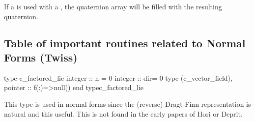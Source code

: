 \documentclass{hitec}     %
\begin{document}
{{{If a   is used with a , the quaternion array will be filled with the resulting quaternion.




\subsection{Table of  important routines related to Normal Forms (Twiss) }\label{s:improu}

\begin{code}
type c_factored_lie
integer :: n = 0
integer :: dir= 0
type (c_vector_field), pointer :: f(:)=>null()
end typec_factored_lie
\end{code}

This type is used in normal forms since the (reverse)-Dragt-Finn representation is natural and this useful. This is not found in the early papers of Hori\cite{hori,horid} or Deprit\cite{deprit}.



}}}
\end{document}
